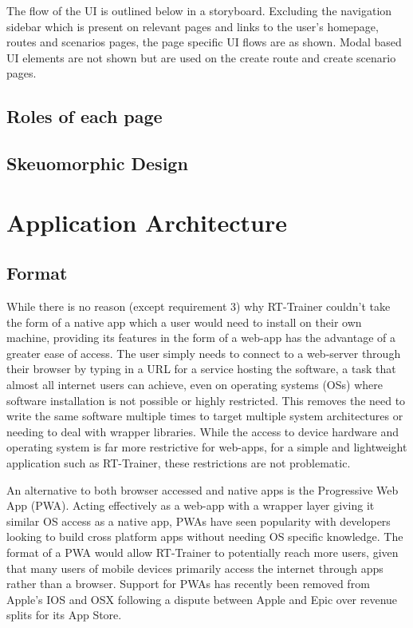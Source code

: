 The flow of the UI is outlined below in a storyboard. Excluding the navigation sidebar which is present on relevant pages and links to the user's homepage, routes and scenarios pages, the page specific UI flows are as shown. Modal based UI elements are not shown but are used on the create route and create scenario pages.

\subsection{Roles of each page}


\subsection{Skeuomorphic Design}

\section{Application Architecture}

\subsection{Format}
While there is no reason (except requirement 3) why RT-Trainer couldn't take the form of a native app which a user would need to install on their own machine, providing its features in the form of a web-app has the advantage of a greater ease of access. The user simply needs to connect to a web-server through their browser by typing in a URL for a service hosting the software, a task that almost all internet users can achieve, even on operating systems (OSs) where software installation is not possible or highly restricted. This removes the need to write the same software multiple times to target multiple system architectures or needing to deal with wrapper libraries. While the access to device hardware and operating system is far more restrictive for web-apps, for a simple and lightweight application such as RT-Trainer, these restrictions are not problematic. 

An alternative to both browser accessed and native apps is the Progressive Web App (PWA). Acting effectively as a web-app with a wrapper layer giving it similar OS access as a native app, PWAs have seen popularity with developers looking to build cross platform apps without needing OS specific knowledge. The format of a PWA would allow RT-Trainer to potentially reach more users, given that many users of mobile devices primarily access the internet through apps rather than a browser. Support for PWAs has recently been removed from Apple's IOS and OSX following a dispute between Apple and Epic over revenue splits for its App Store. 

